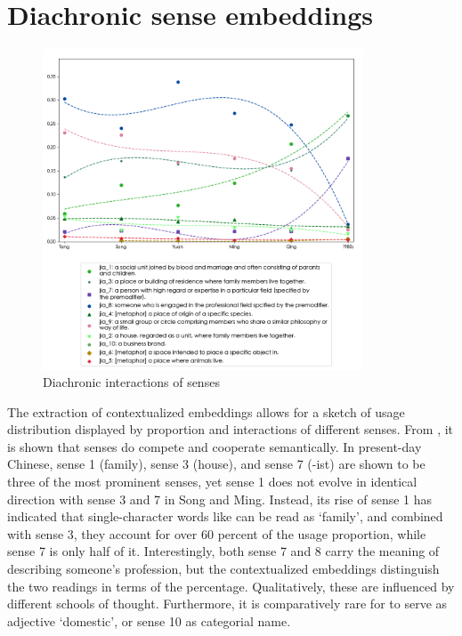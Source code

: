 \section{Diachronic sense embeddings}
\begin{figure}[H]
    \centering
    \includegraphics[width=0.85\textwidth]{figures/jia_en}
    \caption{Diachronic interactions of senses}
    \label{fig:jia_en}
\end{figure}

The extraction of contextualized embeddings allows for a sketch of usage distribution displayed by proportion and interactions of different senses. From , it is shown that senses do compete and cooperate semantically. In present-day Chinese, sense 1 (family), sense 3 (house), and sense 7 (-ist) are shown to be three of the most prominent senses, yet sense 1 does not evolve in identical direction with sense 3 and 7 in Song and Ming. Instead, its rise of sense 1 has indicated that single-character words like \jia can be read as `family', and combined with sense 3, they account for over 60 percent of the usage proportion, while sense 7 is only half of it. Interestingly, both sense 7 and 8 carry the meaning of describing someone's profession, but the contextualized embeddings distinguish the two readings in terms of the percentage. Qualitatively, these are influenced by different schools of thought. Furthermore, it is comparatively rare for \jia to serve as adjective `domestic', or sense 10 as categorial name.


